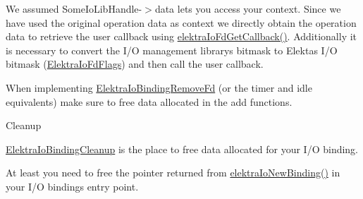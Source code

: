 \begin{DoxyCodeInclude}{0}
\DoxyCodeLine{\{}
\DoxyCodeLine{        \textcolor{comment}{// For this example let's assume handle is passed as argument}}
\DoxyCodeLine{}
\DoxyCodeLine{        \textcolor{comment}{// Convert bitmask to Elekta's flags}}
\DoxyCodeLine{\}}
\end{DoxyCodeInclude}
 We assumed {\ttfamily Some\+Io\+Lib\+Handle-\/$>$data} let\textquotesingle{}s you access your context. Since we have used the original operation data as context we directly obtain the operation data to retrieve the user callback using \mbox{\hyperlink{io_8c_a885381fdd55cf957af1d65db7522899a}{elektra\+Io\+Fd\+Get\+Callback()}}. Additionally it is necessary to convert the I/O management library\textquotesingle{}s bitmask to Elekta\textquotesingle{}s I/O bitmask (\mbox{\hyperlink{kdbio_8h_ac46f42188abb1fa28c3116b8cb755825}{Elektra\+Io\+Fd\+Flags}}) and then call the user callback.

When implementing \mbox{\hyperlink{kdbio_8h_af1d03ff367130892ec3d1f4788eb8277}{Elektra\+Io\+Binding\+Remove\+Fd}} (or the timer and idle equivalents) make sure to free data allocated in the add functions.

\begin{DoxyParagraph}{Cleanup}

\end{DoxyParagraph}
\mbox{\hyperlink{kdbio_8h_a08d3ce531bbd1c5acedbdb9822b24d6d}{Elektra\+Io\+Binding\+Cleanup}} is the place to free data allocated for your I/O binding.

At least you need to free the pointer returned from \mbox{\hyperlink{io_8c_a8dd14e7bd04afb798ea30ff8feb5f3a6}{elektra\+Io\+New\+Binding()}} in your I/O binding\textquotesingle{}s entry point.

